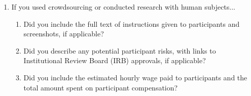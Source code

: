 \documentclass{article}
\begin{document}
\begin{enumerate}
\item If you used crowdsourcing or conducted research with human subjects...
\begin{enumerate}
  \item Did you include the full text of instructions given to participants and screenshots, if applicable?
  \item Did you describe any potential participant risks, with links to Institutional Review Board (IRB) approvals, if applicable?
  \item Did you include the estimated hourly wage paid to participants and the total amount spent on participant compensation?
\end{enumerate}

\end{enumerate}
\end{document}
